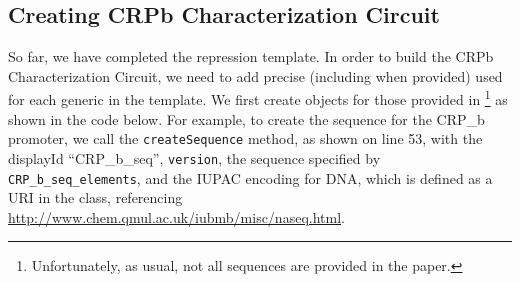 \subsection*{Creating CRPb Characterization Circuit}
So far, we have completed the repression template. In order to build the CRPb Characterization Circuit, we need to add precise (including  when provided)  used for each generic  in the template. We first create  objects for those provided in \cite{kiani2014crispr}\footnote{Unfortunately, as usual, not all sequences are provided in the paper.} as shown in the code below. For example, to create the sequence for the CRP\_b promoter, we call the \lstinline+createSequence+ method, as shown on line 53, with the displayId ``CRP\_b\_seq'', \lstinline+version+, the sequence specified by \lstinline+CRP_b_seq_elements+, and the IUPAC encoding for DNA, which is defined as a URI in the  class, referencing \url{http://www.chem.qmul.ac.uk/iubmb/misc/naseq.html}.

